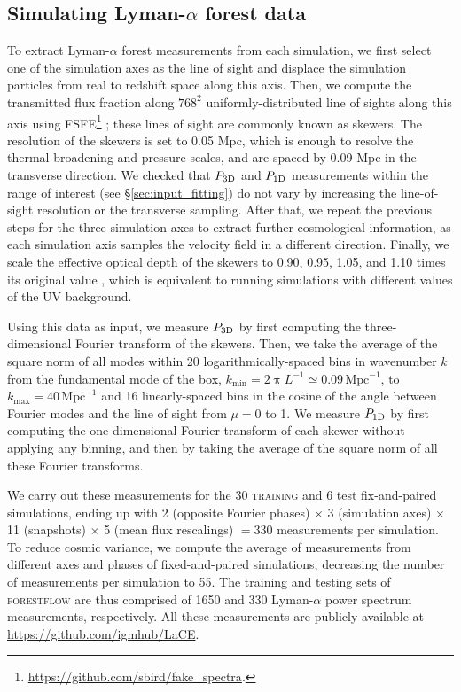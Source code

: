 \documentclass{aa}
\newcommand{\lya}{Lyman-$\alpha$\xspace}
\newcommand{\lyaf}{Lyman-$\alpha$ forest\xspace}
\newcommand{\poned}{\ensuremath{P_{\rm 1D}}\xspace}
\newcommand{\pthreed}{\ensuremath{P_{\rm 3D}}\xspace}
\newcommand{\forestflow}{\textsc{forestflow}\xspace}
\newcommand{\lacehc}{\textsc{training}\xspace}
\newcommand{\iMpc}{\ensuremath{\,\mathrm{Mpc}^{-1}}}
\begin{document}

\subsection{Simulating \lyaf data}
\label{sec:input_extract_lya}

To extract \lyaf measurements from each simulation, we first select one of the simulation axes as the line of sight and displace the simulation particles from real to redshift space along this axis. Then, we compute the transmitted flux fraction along $768^2$ uniformly-distributed line of sights along this axis using \textsc{FSFE}\footnote{\url{https://github.com/sbird/fake_spectra}.} \citep{bird2017FSFEFakeSpectra}; these lines of sight are commonly known as skewers. The resolution of the skewers is set to 0.05 Mpc, which is enough to resolve the thermal broadening and pressure scales, and are spaced by 0.09 Mpc in the transverse direction. We checked that \pthreed and \poned measurements within the range of interest (see \S\ref{sec:input_fitting}) do not vary by increasing the line-of-sight resolution or the transverse sampling. After that, we repeat the previous steps for the three simulation axes to extract further cosmological information, as each simulation axis samples the velocity field in a different direction. Finally, we scale the effective optical depth of the skewers to 0.90, 0.95, 1.05, and 1.10 times its original value \citep[see][for more details about this approach]{hydro_Lukic2015}, which is equivalent to running simulations with different values of the UV background.

Using this data as input, we measure \pthreed by first computing the three-dimensional Fourier transform of the skewers. Then, we take the average of the square norm of all modes within 20 logarithmically-spaced bins in wavenumber $k$ from the fundamental mode of the box, $k_\mathrm{min}=2\uppi L^{-1} \simeq 0.09\iMpc$, to $k_\mathrm{max}=40\iMpc$ and 16 linearly-spaced bins in the cosine of the angle between Fourier modes and the line of sight from $\mu=0$ to 1. We measure \poned by first computing the one-dimensional Fourier transform of each skewer without applying any binning, and then by taking the average of the square norm of all these Fourier transforms.

We carry out these measurements for the 30 \lacehc and 6 test fix-and-paired simulations, ending up with 2 (opposite Fourier phases) $\times$ 3 (simulation axes) $\times$ 11 (snapshots) $\times$ 5 (mean flux rescalings) $=330$ measurements per simulation. To reduce cosmic variance, we compute the average of measurements from different axes and phases of fixed-and-paired simulations, decreasing the number of measurements per simulation to 55. The training and testing sets of \forestflow are thus comprised of 1650 and 330 \lya power spectrum measurements, respectively. All these measurements are publicly available at \url{https://github.com/igmhub/LaCE}.
\end{document}
